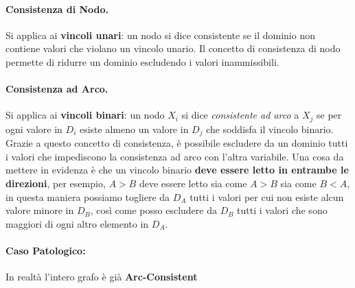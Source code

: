 \paragraph{Consistenza di Nodo.}Si applica ai \textbf{vincoli unari}: un nodo si dice consistente se il dominio non contiene valori
che violano un vincolo unario. Il concetto di consistenza di nodo permette di ridurre un dominio escludendo i valori
inammissibili.
\paragraph{Consistenza ad Arco.}Si applica ai \textbf{vincoli binari}: un nodo $X_i$ si dice \textit{consistente ad arco} a $X_j$
se per ogni valore in $D_i$ esiste almeno un valore in $D_j$ che soddisfa il vincolo binario. Grazie a questo concetto di consistenza,
è possibile escludere da un dominio tutti i valori che impediscono la consistenza ad arco con l'altra variabile.
Una cosa da mettere in evidenza è che un vincolo binario \textbf{deve essere letto in entrambe le direzioni}, per esempio,
$A > B$ deve essere letto sia come $A > B$ sia come $B < A$, in questa maniera possiamo togliere da $D_A$ tutti i valori
per cui non esiste alcun valore minore in $D_B$, così come posso escludere da $D_B$ tutti i valori che sono maggiori di ogni altro
elemento in $D_A$.

\paragraph{Caso Patologico:} 
\begin{center}
\end{center}
In realtà l'intero grafo è già \textbf{Arc-Consistent}